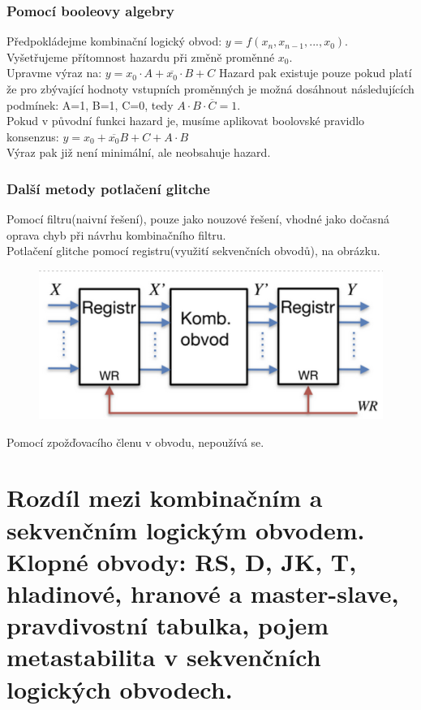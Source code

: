 \subsubsection{Pomocí booleovy algebry}
Předpokládejme kombinační logický obvod: \(y = f(x_n,x_{n-1},...,x_0)\).\\
Vyšetřujeme přítomnost hazardu při změně proměnné \(x_0\).\\
Upravme výraz na: \(y = x_0\cdot A + \overline{x_0}\cdot B + C\)
Hazard pak existuje pouze pokud platí že pro zbývající hodnoty vstupních proměnných je možná dosáhnout následujících podmínek: A=1, B=1, C=0, tedy \(A\cdot B \cdot \overline{C} = 1\).\\
Pokud v původní funkci hazard je, musíme aplikovat boolovské pravidlo konsenzus: \(y = x_0 + \overline{x_0}B + C + A\cdot B\)\\
Výraz pak již není minimální, ale neobsahuje hazard.\\

\subsubsection{Další metody potlačení glitche}
Pomocí filtru(naivní řešení), pouze jako nouzové řešení, vhodné jako dočasná oprava chyb při návrhu kombinačního filtru.\\
Potlačení glitche pomocí registru(využití sekvenčních obvodů), na obrázku.\\
\begin{figure}[h!]
    \centering
    \includegraphics*[scale = 0.5]{img/HazElim.png}
\end{figure}
Pomocí zpožďovacího členu v obvodu, nepoužívá se.

\section{Rozdíl mezi kombinačním a sekvenčním logickým obvodem. Klopné obvody: RS, D, JK, T, hladinové, hranové a master-slave, pravdivostní tabulka, pojem metastabilita v sekvenčních logických obvodech.}
